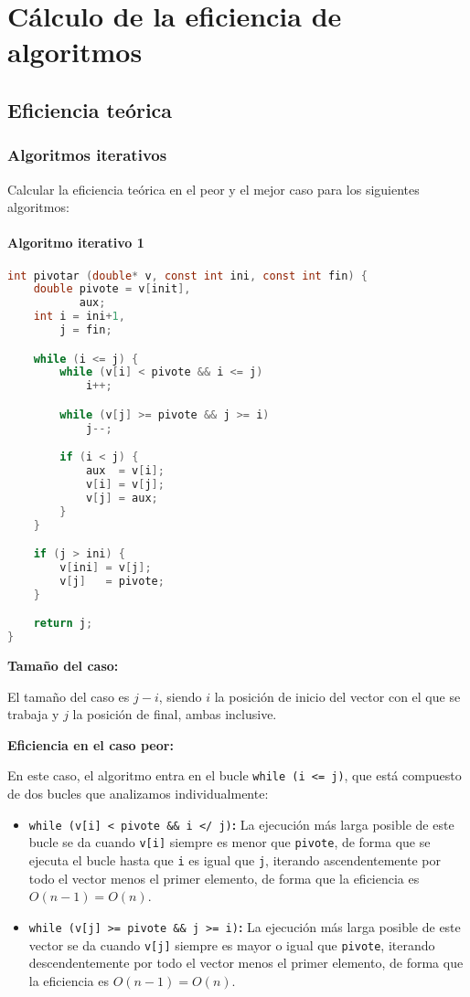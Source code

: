 \chapter{Cálculo de la eficiencia de algoritmos}\label{eficiencia}

\section{Eficiencia teórica}\label{eficiencia-teorica}

\subsection{Algoritmos iterativos}\label{eficiencia-teorica-iterativos}

Calcular la eficiencia teórica en el peor y el mejor caso para los siguientes algoritmos:

\subsubsection{Algoritmo iterativo 1}

\begin{lstlisting}[language=C]
int pivotar (double* v, const int ini, const int fin) {
	double pivote = v[init],
	       aux;
	int i = ini+1,
	    j = fin;

	while (i <= j) {
		while (v[i] < pivote && i <= j)
			i++;

		while (v[j] >= pivote && j >= i)
			j--;

		if (i < j) {
			aux  = v[i];
			v[i] = v[j];
			v[j] = aux;
		}
	}

	if (j > ini) {
		v[ini] = v[j];
		v[j]   = pivote;
	}

	return j;
}
\end{lstlisting}

\textbf{Tamaño del caso:}

El tamaño del caso es $j-i$, siendo $i$ la posición de inicio del vector con el que se trabaja y $j$ la posición de final, ambas inclusive.

\textbf{Eficiencia en el caso peor:}

En este caso, el algoritmo entra en el bucle \texttt{while (i <= j)}, que está compuesto de dos bucles que analizamos individualmente:

\begin{itemize}
	\item\texttt{while (v[i] < pivote \&\& i </ j)}\textbf{:} La ejecución más larga posible de este bucle se da cuando \texttt{v[i]} siempre es menor que \texttt{pivote}, de forma que se ejecuta el bucle hasta que \texttt{i} es igual que \texttt{j}, iterando ascendentemente por todo el vector menos el primer elemento, de forma que la eficiencia es $O(n-1)=O(n)$.
	\item\texttt{while (v[j] >= pivote \&\& j >= i)}\textbf{:} La ejecución más larga posible de este vector se da cuando \texttt{v[j]} siempre es mayor o igual que \texttt{pivote}, iterando descendentemente por todo el vector menos el primer elemento, de forma que la eficiencia es $O(n-1)=O(n)$.
\end{itemize}

